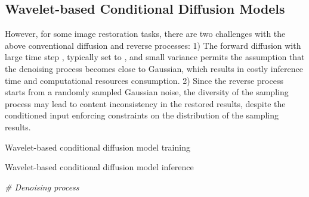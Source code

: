 \subsection{Wavelet-based Conditional Diffusion Models}\label{subsec:Wavelet-based Conditional Diffusion Models}
However, for some image restoration tasks, there are two challenges with the above conventional diffusion and reverse processes: 1) The forward diffusion with large time step , typically set to , and small variance  permits the assumption that the denoising process becomes close to Gaussian, which results in costly inference time and computational resources consumption. 2) Since the reverse process starts from a randomly sampled Gaussian noise, the diversity of the sampling process may lead to content inconsistency in the restored results, despite the conditioned input enforcing constraints on the distribution of the sampling results.
\begin{algorithm}[!t]
	\caption{Wavelet-based conditional diffusion model training}
	\label{algo:1} 
	  
	
	
	
	\Output{,  ()}
\end{algorithm}
\begin{algorithm}[!t]
	\caption{Wavelet-based conditional diffusion model inference}
	\label{algo:2} 
	  
	
	\emph{\# Denoising process}
	
	
	
	\Output{ ()}
\end{algorithm}

